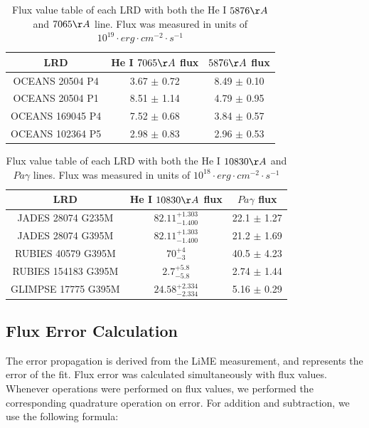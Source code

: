 \documentclass[letterpaper]{aastex701}
\begin{document}
\begin{table}[H]
\begin{center}
\caption{Flux value table of each LRD with both the He I $5876\AA$ and $7065\AA$ line. Flux was measured in units of $10^{19} \cdot erg\cdot cm^{-2} \cdot s^{-1}$}
\begin{tabular}{|c|c|c|}
    \hline
    \centering
    \textbf{LRD} & He I $7065\AA$ flux & $5876\AA$ flux \\ \hline
    OCEANS 20504 P4 & 3.67 $\pm$ 0.72 & 8.49 $\pm$ 0.10 \\ \hline
    OCEANS 20504 P1 & 8.51 $\pm$ 1.14 & 4.79 $\pm$ 0.95 \\  \hline
    OCEANS 169045 P4 & 7.52 $\pm$ 0.68 & 3.84 $\pm$ 0.57 \\   \hline
    OCEANS 102364 P5 & 2.98 $\pm$ 0.83 & 2.96 $\pm$ 0.53 \\   \hline
\end{tabular}
\end{center}
\end{table}

\begin{table}[H]
\begin{center}
\caption{Flux value table of each LRD with both the He I $10830\AA$ and $Pa\gamma$ lines. Flux was measured in units of $10^{18} \cdot erg\cdot cm^{-2} \cdot s^{-1}$}
\begin{tabular}{|c|c|c|}
    \hline
    \centering
    \textbf{LRD} & He I $10830\AA$ flux & $Pa\gamma$ flux \\ \hline
    JADES 28074 G235M & $82.11^{+1.303}_{-1.400}$ & 22.1 $\pm$ 1.27 \\ \hline
    JADES 28074 G395M & $82.11^{+1.303}_{-1.400}$ & 21.2 $\pm$ 1.69 \\  \hline
    RUBIES 40579 G395M & $70^{+4}_{-3}$ & 40.5 $\pm$ 4.23 \\   \hline
    RUBIES 154183 G395M & $2.7^{+5.8}_{-5.8}$ & 2.74 $\pm$ 1.44 \\   \hline
    GLIMPSE 17775 G395M & $24.58^{+2.334}_{-2.334}$ & 5.16 $\pm$ 0.29 \\   \hline
\end{tabular}
\end{center}
\end{table}

\subsection{Flux Error Calculation}
The error propagation is derived from the LiME measurement, and represents the error of the fit. Flux error was calculated simultaneously with flux values. Whenever operations were performed on flux values, we performed the corresponding quadrature operation on error. For addition and subtraction, we use the following formula:
\end{document}
